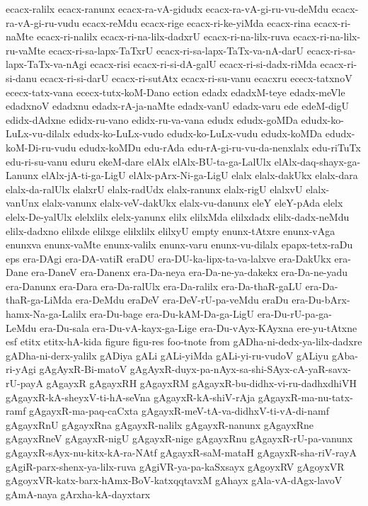 {ecacx-ralilx
ecacx-ranunx
ecacx-ra-vA-gidudx
ecacx-ra-vA-gi-ru-vu-deMdu
ecacx-ra-vA-gi-ru-vudu
ecacx-reMdu
ecacx-rige
ecacx-ri-ke-yiMda
ecacx-rina
ecacx-ri-naMte
ecacx-ri-nalilx
ecacx-ri-na-lilx-dadxrU
ecacx-ri-na-lilx-ruva
ecacx-ri-na-lilx-ru-vaMte
ecacx-ri-sa-lapx-TaTxrU
ecacx-ri-sa-lapx-TaTx-va-nA-darU
ecacx-ri-sa-lapx-TaTx-va-nAgi
ecacx-risi
ecacx-ri-si-dA-galU
ecacx-ri-si-dadx-riMda
ecacx-ri-si-danu
ecacx-ri-si-darU
ecacx-ri-sutAtx
ecacx-ri-su-vanu
ecacxru
ececx-tatxnoV
ececx-tatx-vana
ececx-tutx-koM-Dano
ection
edadx
edadxM-teye
edadx-meVle
edadxnoV
edadxnu
edadx-rA-ja-naMte
edadx-vanU
edadx-varu
ede
edeM-digU
edidx-dAdxne
edidx-ru-vano
edidx-ru-va-vana
edudx
edudx-goMDa
edudx-ko-LuLx-vu-dilalx
edudx-ko-LuLx-vudo
edudx-ko-LuLx-vudu
edudx-koMDa
edudx-koM-Di-ru-vudu
edudx-koMDu
edu-rAda
edu-rA-gi-ru-vu-da-nenxlalx
edu-riTuTx
edu-ri-su-vanu
eduru
ekeM-dare
elAlx
elAlx-BU-ta-ga-LalUlx
elAlx-daq-shayx-ga-Lanunx
elAlx-jA-ti-ga-LigU
elAlx-pArx-Ni-ga-LigU
elalx
elalx-dakUkx
elalx-dara
elalx-da-ralUlx
elalxrU
elalx-radUdx
elalx-ranunx
elalx-rigU
elalxvU
elalx-vanUnx
elalx-vanunx
elalx-veV-dakUkx
elalx-vu-danunx
eleY
eleY-pAda
elelx
elelx-De-yalUlx
elelxlilx
elelx-yanunx
elilx
elilxMda
elilxdadx
elilx-dadx-neMdu
elilx-dadxno
elilxde
elilxge
elilxlilx
elilxyU
empty
enunx-tAtxre
enunx-vAga
enunxva
enunx-vaMte
enunx-valilx
enunx-varu
enunx-vu-dilalx
epapx-tetx-raDu
eps
era-DAgi
era-DA-vatiR
eraDU
era-DU-ka-lipx-ta-va-lalxve
era-DakUkx
era-Dane
era-DaneV
era-Danenx
era-Da-neya
era-Da-ne-ya-dakekx
era-Da-ne-yadu
era-Danunx
era-Dara
era-Da-ralUlx
era-Da-ralilx
era-Da-thaR-gaLU
era-Da-thaR-ga-LiMda
era-DeMdu
eraDeV
era-DeV-rU-pa-veMdu
eraDu
era-Du-bArx-hamx-Na-ga-Lalilx
era-Du-bage
era-Du-kAM-Da-ga-LigU
era-Du-rU-pa-ga-LeMdu
era-Du-sala
era-Du-vA-kayx-ga-Lige
era-Du-vAyx-KAyxna
ere-yu-tAtxne
esf
etitx
etitx-hA-kida
figure
figu-res
foo-tnote
from
gADha-ni-dedx-ya-lilx-dadxre
gADha-ni-derx-yalilx
gADiya
gALi
gALi-yiMda
gALi-yi-ru-vudoV
gALiyu
gAba-ri-yAgi
gAgAyxR-Bi-matoV
gAgAyxR-duyx-pa-nAyx-sa-shi-SAyx-cA-yaR-savx-rU-payA
gAgayxR
gAgayxRH
gAgayxRM
gAgayxR-bu-didhx-vi-ru-dadhxdhiVH
gAgayxR-kA-sheyxV-ti-hA-seVna
gAgayxR-kA-shiV-rAja
gAgayxR-ma-nu-tatx-ramf
gAgayxR-ma-paq-caCxta
gAgayxR-meV-tA-va-didhxV-ti-vA-di-namf
gAgayxRnU
gAgayxRna
gAgayxR-nalilx
gAgayxR-nanunx
gAgayxRne
gAgayxRneV
gAgayxR-nigU
gAgayxR-nige
gAgayxRnu
gAgayxR-rU-pa-vanunx
gAgayxR-sAyx-nu-kitx-kA-ra-NAtf
gAgayxR-saM-mataH
gAgayxR-sha-riV-rayA
gAgiR-parx-shenx-ya-lilx-ruva
gAgiVR-ya-pa-kaSxsayx
gAgoyxRV
gAgoyxVR
gAgoyxVR-katx-barx-hAmx-BoV-katxqqtavxM
gAhayx
gAla-vA-dAgx-lavoV
gAmA-naya
gArxha-kA-dayxtarx
}
